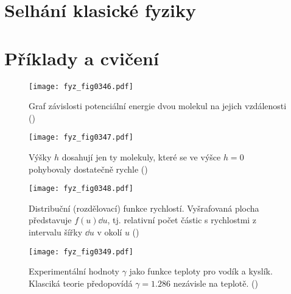   \section{Selhání klasické fyziky}\label{fyz:IchapXLsecVI}
  \section{Příklady a cvičení}\label{fyz:IchapXLsecVII}
  
    \begin{figure}[ht!] %
      \centering
      \texttt{[image: fyz\_fig0346.pdf]}
      \caption{Graf závislosti potenciální energie dvou molekul na jejich vzdálenosti
               (\cite[s.~543]{Feynman01})}
      \label{fyz:fig0346}
    \end{figure}

    \begin{figure}[ht!] %
      \centering
      \texttt{[image: fyz\_fig0347.pdf]}
      \caption{Výšky \(h\) dosahují jen ty molekuly, které se ve výšce \(h=0\) pohybovaly 
               dostatečně rychle
               (\cite[s.~545]{Feynman01})}
      \label{fyz:fig0347}
    \end{figure}

    \begin{figure}[ht!] %
      \centering
      \texttt{[image: fyz\_fig0348.pdf]}
      \caption{Distribuční (rozdělovací) funkce rychlostí. Vyšrafovaná plocha představuje 
               \(f(u)\dd{u}\), tj. relativní počet částic s rychlostmi z intervalu šířky \(\dd{u}\) 
               v okolí \(u\)
               (\cite[s.~525]{Feynman01})}
      \label{fyz:fig0348}
    \end{figure}

    \begin{figure}[ht!] %
      \centering
      \texttt{[image: fyz\_fig0349.pdf]}
      \caption{Experimentální hodnoty \(\gamma\) jako funkce teploty pro vodík a kyslík. Klasciká 
               teorie předopovídá \(\gamma =\num{1.286}\) nezávisle na teplotě. 
               (\cite[s.~525]{Feynman01})}
      \label{fyz:fig0349}
    \end{figure}

